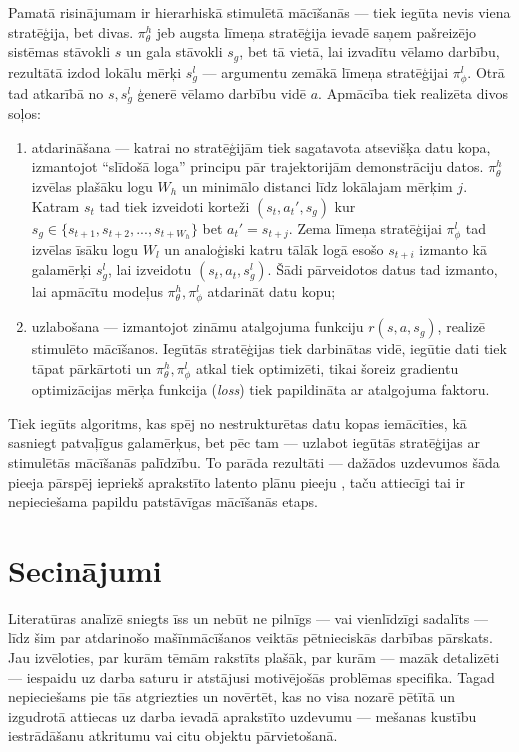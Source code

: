 \documentclass[12pt, a4paper]{article}
\numberwithin{equation}{section} %
\begin{document}
Pamatā risinājumam ir hierarhiskā stimulētā mācīšanās --- tiek iegūta nevis viena stratēģija, bet divas. $\pi_{\theta}^h$ jeb augsta līmeņa stratēģija ievadē saņem pašreizējo sistēmas stāvokli $s$ un gala stāvokli $s_g$, bet tā vietā, lai izvadītu vēlamo darbību, rezultātā izdod lokālu mērķi $s_g^l$ --- argumentu zemākā līmeņa stratēģijai $\pi_{\phi}^l$. Otrā tad atkarībā no $s,s_g^l$ ģenerē vēlamo darbību vidē $a$. Apmācība tiek realizēta divos soļos:

\begin{enumerate}
    \item atdarināšana --- katrai no stratēģijām tiek sagatavota atsevišķa datu kopa, izmantojot ``slīdošā loga'' principu pār trajektorijām demonstrāciju datos. $\pi_{\theta}^h$ izvēlas plašāku logu $W_h$ un minimālo distanci līdz lokālajam mērķim $j$. Katram $s_t $ tad tiek izveidoti korteži $(s_t, a_t', s_g)$ kur $s_g \in \lbrace s_{t+1}, s_{t+2}, ..., s_{t+W_h} \rbrace$ bet $a_t' = s_{t+j}$. Zema līmeņa stratēģijai $\pi_{\phi}^l$ tad izvēlas īsāku logu $W_l$ un analoģiski katru tālāk logā esošo $s_{t+i}$ izmanto kā galamērķi $s_g^l$, lai izveidotu $(s_t, a_t, s_g^l)$. Šādi pārveidotos datus tad izmanto, lai apmācītu modeļus $\pi_{\theta}^h, \pi_{\phi}^l$ atdarināt datu kopu;
    \item uzlabošana --- izmantojot zināmu atalgojuma funkciju $r(s,a,s_g)$, realizē stimulēto mācīšanos. Iegūtās stratēģijas tiek darbinātas vidē, iegūtie dati tiek tāpat pārkārtoti un $\pi_{\theta}^h, \pi_{\phi}^l$ atkal tiek optimizēti, tikai šoreiz gradientu optimizācijas mērķa funkcija (\textit{loss}) tiek papildināta ar atalgojuma faktoru.
\end{enumerate}

Tiek iegūts algoritms, kas spēj no nestrukturētas datu kopas iemācīties, kā sasniegt patvaļīgus galamērķus, bet pēc tam --- uzlabot iegūtās stratēģijas ar stimulētās mācīšanās palīdzību. To parāda rezultāti --- dažādos uzdevumos šāda pieeja pārspēj iepriekš aprakstīto latento plānu pieeju \cite{lynch2020learning}, taču attiecīgi tai ir nepieciešama papildu patstāvīgas mācīšanās etaps.

\newpage
\section{Secinājumi}

Literatūras analīzē sniegts īss un nebūt ne pilnīgs --- vai vienlīdzīgi sadalīts --- līdz šim par atdarinošo mašīnmācīšanos veiktās pētnieciskās darbības pārskats. Jau izvēloties, par kurām tēmām rakstīts plašāk, par kurām --- mazāk detalizēti --- iespaidu uz darba saturu ir atstājusi motivējošās problēmas specifika. Tagad nepieciešams pie tās atgriezties un novērtēt, kas no visa nozarē pētītā un izgudrotā attiecas uz darba ievadā aprakstīto uzdevumu --- mešanas kustību iestrādāšanu atkritumu vai citu objektu pārvietošanā.
\end{document}
